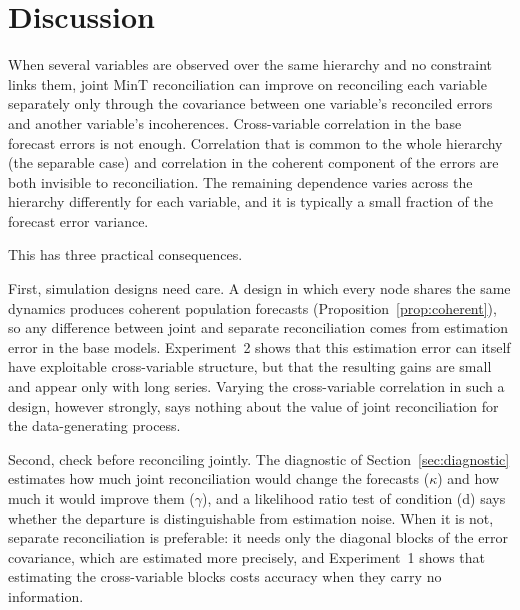 
\section{Discussion}
\label{sec:discussion}

When several variables are observed over the same hierarchy and no constraint links them, joint MinT reconciliation can improve on reconciling each variable separately only through the covariance between one variable's reconciled errors and another variable's incoherences. Cross-variable correlation in the base forecast errors is not enough. Correlation that is common to the whole hierarchy (the separable case) and correlation in the coherent component of the errors are both invisible to reconciliation. The remaining dependence varies across the hierarchy differently for each variable, and it is typically a small fraction of the forecast error variance.

This has three practical consequences.

First, simulation designs need care. A design in which every node shares the same dynamics produces coherent population forecasts (Proposition~\ref{prop:coherent}), so any difference between joint and separate reconciliation comes from estimation error in the base models. Experiment~2 shows that this estimation error can itself have exploitable cross-variable structure, but that the resulting gains are small and appear only with long series. Varying the cross-variable correlation in such a design, however strongly, says nothing about the value of joint reconciliation for the data-generating process.

Second, check before reconciling jointly. The diagnostic of Section~\ref{sec:diagnostic} estimates how much joint reconciliation would change the forecasts ($\kappa$) and how much it would improve them ($\gamma$), and a likelihood ratio test of condition (d) says whether the departure is distinguishable from estimation noise. When it is not, separate reconciliation is preferable: it needs only the diagonal blocks of the error covariance, which are estimated more precisely, and Experiment~1 shows that estimating the cross-variable blocks costs accuracy when they carry no information.


